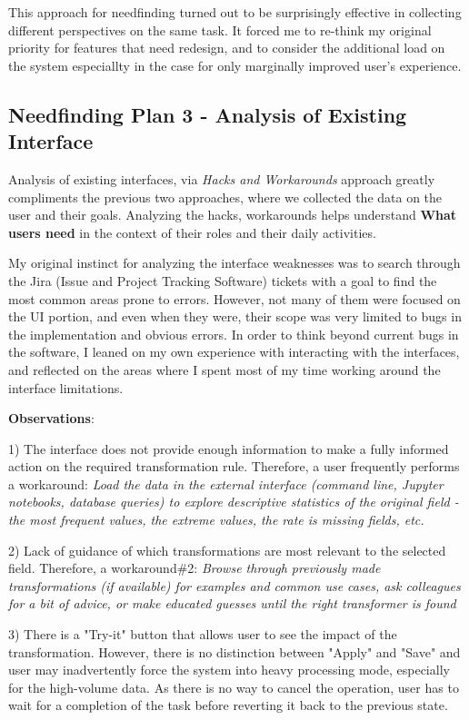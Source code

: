 \documentclass[12pt,letterpaper]{article}
\begin{document}
This approach for needfinding turned out to be surprisingly effective in collecting different perspectives on the same task. It forced me to re-think my original priority for features that need redesign, and to consider the additional load on the system especiallty in the case for only marginally improved user's experience. 


\subsection*{Needfinding Plan 3 - Analysis of Existing Interface}
Analysis of existing interfaces, via \textit{Hacks and Workarounds} approach greatly compliments the previous two approaches, where we collected the data on the user and their goals. Analyzing the hacks, workarounds helps understand \textbf{What users need} in the context of their roles and their daily activities. 

My original instinct for analyzing the interface weaknesses was to search through the Jira (Issue and Project Tracking Software) tickets with a goal to find the most common areas prone to errors. However, not many of them were focused on the UI portion, and even when they were, their scope was very limited to bugs in the implementation and obvious errors. In order to think beyond current bugs in the software, I leaned on my own experience with interacting with the interfaces, and reflected on the areas where I spent most of my time working around the interface limitations.  

\textbf{Observations}:

1) The interface does not provide enough information to make a fully informed action on the required transformation rule. Therefore, a user frequently performs a workaround: \textit{Load the data in the external interface (command line, Jupyter notebooks, database queries) to explore descriptive statistics of the original field - the most frequent values,  the extreme values, the rate is missing fields, etc.}

2) Lack of guidance of which transformations are most relevant to the selected field. Therefore, a workaround\#2: \textit{Browse through previously made transformations (if available) for examples and common use cases, ask colleagues for a bit of advice, or make educated guesses until the right transformer is found}

3) There is a "Try-it" button that allows user to see the impact of the transformation. However, there is no distinction between "Apply" and "Save" and user may inadvertently force the system into heavy processing mode, especially for the high-volume data.  As there is no way to cancel the operation, user has to wait for a completion of the task before reverting it back to the previous state.
\end{document}
